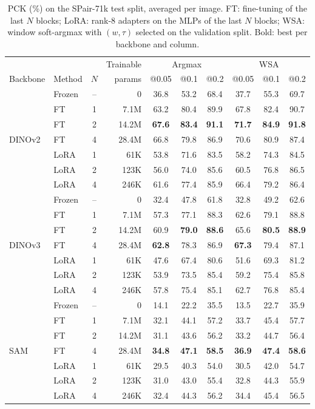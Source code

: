 \begin{table}[t]
\centering
\caption{PCK (\%) on the SPair-71k test split, averaged per image. FT: fine-tuning of the last $N$ blocks; LoRA: rank-8 adapters on the MLPs of the last $N$ blocks; WSA: window soft-argmax with $(w,\tau)$ selected on the validation split. Bold: best per backbone and column.}
\label{tab:main}
\small
\begin{tabular}{llcr ccc ccc}
\toprule
 & & & Trainable & \multicolumn{3}{c}{Argmax} & \multicolumn{3}{c}{WSA} \\
\cmidrule(lr){5-7}\cmidrule(lr){8-10}
Backbone & Method & $N$ & params & @0.05 & @0.1 & @0.2 & @0.05 & @0.1 & @0.2 \\
\midrule
\multirow{7}{*}{DINOv2} & Frozen & -- & 0 & 36.8 & 53.2 & 68.4 & 37.7 & 55.3 & 69.7 \\
 & FT & 1 & 7.1M & 63.2 & 80.4 & 89.9 & 67.8 & 82.4 & 90.7 \\
 & FT & 2 & 14.2M & \textbf{67.6} & \textbf{83.4} & \textbf{91.1} & \textbf{71.7} & \textbf{84.9} & \textbf{91.8} \\
 & FT & 4 & 28.4M & 66.8 & 79.8 & 86.9 & 70.6 & 80.9 & 87.4 \\
 & LoRA & 1 & 61K & 53.8 & 71.6 & 83.5 & 58.2 & 74.3 & 84.5 \\
 & LoRA & 2 & 123K & 56.0 & 74.0 & 85.6 & 60.5 & 76.8 & 86.5 \\
 & LoRA & 4 & 246K & 61.6 & 77.4 & 85.9 & 66.4 & 79.2 & 86.4 \\
\midrule
\multirow{7}{*}{DINOv3} & Frozen & -- & 0 & 32.4 & 47.8 & 61.8 & 32.8 & 49.2 & 62.6 \\
 & FT & 1 & 7.1M & 57.3 & 77.1 & 88.3 & 62.6 & 79.1 & 88.8 \\
 & FT & 2 & 14.2M & 60.9 & \textbf{79.0} & \textbf{88.6} & 65.6 & \textbf{80.5} & \textbf{88.9} \\
 & FT & 4 & 28.4M & \textbf{62.8} & 78.3 & 86.9 & \textbf{67.3} & 79.4 & 87.1 \\
 & LoRA & 1 & 61K & 47.6 & 67.4 & 80.6 & 51.6 & 69.3 & 81.2 \\
 & LoRA & 2 & 123K & 53.9 & 73.5 & 85.4 & 59.2 & 75.4 & 85.8 \\
 & LoRA & 4 & 246K & 57.8 & 75.4 & 85.1 & 62.7 & 76.8 & 85.4 \\
\midrule
\multirow{7}{*}{SAM} & Frozen & -- & 0 & 14.1 & 22.2 & 35.5 & 13.5 & 22.7 & 35.9 \\
 & FT & 1 & 7.1M & 32.1 & 44.1 & 57.2 & 33.7 & 45.4 & 57.7 \\
 & FT & 2 & 14.2M & 31.1 & 43.6 & 56.2 & 33.2 & 44.7 & 56.4 \\
 & FT & 4 & 28.4M & \textbf{34.8} & \textbf{47.1} & \textbf{58.5} & \textbf{36.9} & \textbf{47.4} & \textbf{58.6} \\
 & LoRA & 1 & 61K & 29.5 & 40.3 & 54.0 & 30.5 & 42.0 & 54.7 \\
 & LoRA & 2 & 123K & 31.0 & 43.0 & 55.4 & 32.8 & 44.3 & 55.9 \\
 & LoRA & 4 & 246K & 32.4 & 44.3 & 56.2 & 34.4 & 45.4 & 56.5 \\
\bottomrule
\end{tabular}
\end{table}
